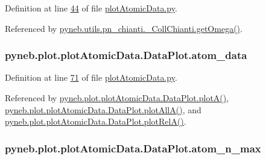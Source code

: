 Definition at line \hyperlink{plot_atomic_data_8py_source_l00044}{44} of file \hyperlink{plot_atomic_data_8py_source}{plot\-Atomic\-Data.\-py}.



Referenced by \hyperlink{pn__chianti_8py_source_l00507}{pyneb.\-utils.\-pn\-\_\-chianti.\-\_\-\-Coll\-Chianti.\-get\-Omega()}.

\hypertarget{classpyneb_1_1plot_1_1plot_atomic_data_1_1_data_plot_aee33ad460a38cb4293a5bd89cec12294}{
\subsubsection[{atom\-\_\-data}]{\setlength{\rightskip}{0pt plus 5cm}pyneb.\-plot.\-plot\-Atomic\-Data.\-Data\-Plot.\-atom\-\_\-data}}\label{classpyneb_1_1plot_1_1plot_atomic_data_1_1_data_plot_aee33ad460a38cb4293a5bd89cec12294}


Definition at line \hyperlink{plot_atomic_data_8py_source_l00071}{71} of file \hyperlink{plot_atomic_data_8py_source}{plot\-Atomic\-Data.\-py}.



Referenced by \hyperlink{plot_atomic_data_8py_source_l00117}{pyneb.\-plot.\-plot\-Atomic\-Data.\-Data\-Plot.\-plot\-A()}, \hyperlink{plot_atomic_data_8py_source_l00189}{pyneb.\-plot.\-plot\-Atomic\-Data.\-Data\-Plot.\-plot\-All\-A()}, and \hyperlink{plot_atomic_data_8py_source_l00262}{pyneb.\-plot.\-plot\-Atomic\-Data.\-Data\-Plot.\-plot\-Rel\-A()}.

\hypertarget{classpyneb_1_1plot_1_1plot_atomic_data_1_1_data_plot_a668572cfe9a684e7195535d60d343938}{
\subsubsection[{atom\-\_\-n\-\_\-max}]{\setlength{\rightskip}{0pt plus 5cm}pyneb.\-plot.\-plot\-Atomic\-Data.\-Data\-Plot.\-atom\-\_\-n\-\_\-max}}\label{classpyneb_1_1plot_1_1plot_atomic_data_1_1_data_plot_a668572cfe9a684e7195535d60d343938}


